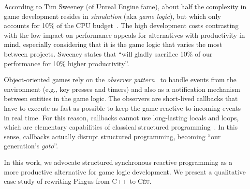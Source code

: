 \documentclass[10pt, conference, compsocconf]{IEEEtran}
\newcommand{\CEU}{\textsc{C\'{e}u}\xspace}
\begin{document}
According to Tim Sweeney (of Unreal Engine fame), about half the complexity in
game development resides in \emph{simulation} (aka \emph{game logic}), but
which only accounts for 10\% of the CPU budget~\cite{games.sweeney}.
The high development costs contrasting with the low impact on performance
appeals for alternatives with productivity in mind, especially considering that
it is the game logic that varies the most between projects.
Sweeney states that ``will gladly sacrifice 10\% of our performance for 10\%
higher productivity''.


Object-oriented games rely on the \emph{observer pattern}~\cite{games.patterns}
to handle events from the environment (e.g., key presses and timers) and also
as a notification mechanism between entities in the game logic.
%
The observers are short-lived callbacks that have to execute as fast as
possible to keep the game reactive to incoming events in real time.
%
For this reason, callbacks cannot use long-lasting locals and loops, which are
elementary capabilities of classical structured
programming~\cite{rp.deprecating,rp.rescala,sync_async.cooperative}.
%
In this sense, callbacks actually disrupt structured programming, becoming
``our generation's \emph{goto}''.%

In this work, we advocate structured synchronous reactive programming as a more
productive alternative for game logic development.
We present a qualitative case study of rewriting Pingus from C++ to \CEU.
\end{document}
